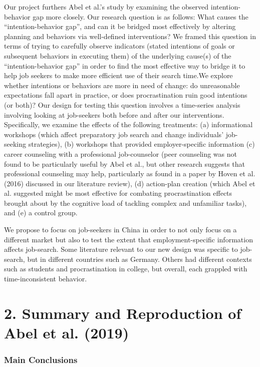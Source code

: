 \documentclass[]{elsarticle} %
\begin{document}
Our project furthers Abel et al.'s study by examining the observed
intention-behavior gap more closely. Our research question is as
follows: What causes the ``intention-behavior gap'', and can it be
bridged most effectively by altering planning and behaviors via
well-defined interventions? We framed this question in terms of trying
to carefully observe indicators (stated intentions of goals or
subsequent behaviors in executing them) of the underlying cause(s) of
the ``intention-behavior gap'' in order to find the most effective way
to bridge it to help job seekers to make more efficient use of their
search time.We explore whether intentions or behaviors are more in need
of change: do unreasonable expectations fall apart in practice, or does
procrastination ruin good intentions (or both)? Our design for testing
this question involves a time-series analysis involving looking at
job-seekers both before and after our interventions. Specifically, we
examine the effects of the following treatments: (a) informational
workshops (which affect preparatory job search and change individuals'
job-seeking strategies), (b) workshops that provided employer-specific
information (c) career counseling with a professional job-counselor
(peer counseling was not found to be particularly useful by Abel et al.,
but other research suggests that professional counseling may help,
particularly as found in a paper by Hoven et al. (2016) discussed in our
literature review), (d) action-plan creation (which Abel et al.
suggested might be most effective for combating procrastination effects
brought about by the cognitive load of tackling complex and unfamiliar
tasks), and (e) a control group.

We propose to focus on job-seekers in China in order to not only focus
on a different market but also to test the extent that
employment-specific information affects job-search. Some literature
relevant to our new design was specific to job-search, but in different
countries such as Germany. Others had different contexts such as
students and procrastination in college, but overall, each grappled with
time-inconsistent behavior.

\section{2. Summary and Reproduction of Abel et al.
(2019)}\label{summary-and-reproduction-of-abel_bridging_2019}

\subsubsection{Main Conclusions}\label{main-conclusions}
\end{document}
